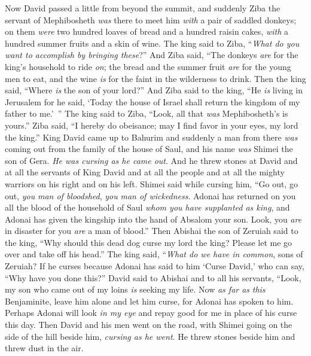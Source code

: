 \begin{biblechapter} %
 Now David passed a little from beyond the summit, and suddenly Ziba the servant of Mephibosheth \textit{was} there to meet him \textit{with} a pair of saddled donkeys; on them \textit{were} two hundred loaves of bread and a hundred raisin cakes, \textit{with} a hundred summer fruits and a skin of wine.
\verse The king said to Ziba, “\textit{What do you want to accomplish by bringing these}?” And Ziba said, “The donkeys \textit{are} for the king’s household to ride \textit{on}; the bread and the summer fruit \textit{are} for the young men to eat, and the wine \textit{is} for the faint in the wilderness to drink.
\verse Then the king said, “Where \textit{is} the son of your lord?” And Ziba said to the king, “He \textit{is} living in Jerusalem for he said, ‘Today the house of Israel shall return the kingdom of my father to me.’ ”
\verse The king said to Ziba, “Look, all that \textit{was} Mephibosheth’s is yours.” Ziba said, “I hereby do obeisance; may I find favor in your eyes, my lord the king.”
 King David came up to Bahurim and suddenly a man from there \textit{was} coming out from the family of the house of Saul, and his name \textit{was} Shimei the son of Gera. \textit{He was cursing as he came out}.
\verse And he threw stones at David and at all the servants of King David and at all the people and at all the mighty warriors on his right and on his left.
\verse Shimei said while cursing him, “Go out, go out, \textit{you} \textit{man of bloodshed}, \textit{you} \textit{man of wickedness}.
\verse Adonai has returned on you all the blood of the household of Saul \textit{whom you have supplanted as king}, and Adonai has given the kingship into the hand of Absalom your son. Look, you \textit{are} in disaster for you \textit{are} a man of blood.”
\verse Then Abishai the son of Zeruiah said to the king, “Why should this dead dog curse my lord the king? Please let me go over and take off his head.”
\verse The king said, “\textit{What do we have in common}, sons of Zeruiah? If he curses because Adonai has said to him ‘Curse David,’ who can say, “Why have you done this?”
\verse David said to Abishai and to all his servants, “Look, my son who came out of my loins \textit{is} seeking my life. Now \textit{as far as} \textit{this} Benjaminite, leave him alone and let him curse, for Adonai has spoken to him.
\verse Perhaps Adonai will look \textit{in my eye} and repay good for me in place of his curse this day.
\verse Then David and his men went on the road, with Shimei going on the side of the hill beside him, \textit{cursing as he went}. He threw stones beside him and threw dust in the air.

\end{biblechapter}
